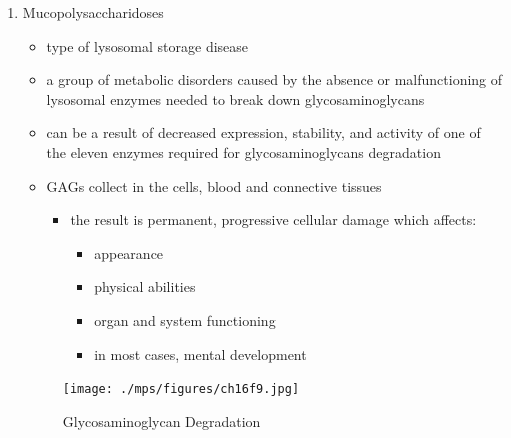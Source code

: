 \documentclass{scrartcl}
\begin{document}
\begin{enumerate}
\item Mucopolysaccharidoses
\label{sec:orgf622f8c}
\begin{itemize}
\item type of lysosomal storage disease
\item a group of metabolic disorders caused by the absence or
malfunctioning of lysosomal enzymes needed to break down
glycosaminoglycans
\item can be a result of decreased expression, stability, and activity of
one of the eleven enzymes required for glycosaminoglycans
degradation
\item GAGs collect in the cells, blood and connective tissues
\begin{itemize}
\item the result is permanent, progressive cellular damage which affects:
\begin{itemize}
\item appearance
\item physical abilities
\item organ and system functioning
\item in most cases, mental development
\end{itemize}
\end{itemize}
\end{itemize}

\begin{figure}[htbp]
\centering
\texttt{[image: ./mps/figures/ch16f9.jpg]}
\caption[Glycosaminoglycan Degradation]{\label{fig:org97e235d}
Glycosaminoglycan Degradation}
\end{figure}


\end{enumerate}
\end{document}

